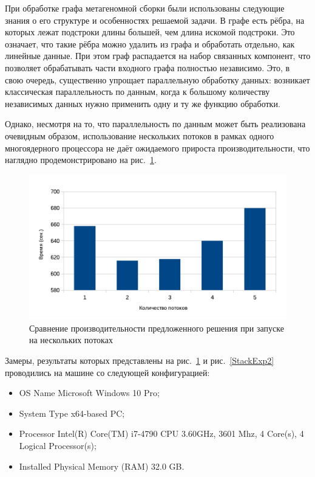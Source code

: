 При обработке графа метагеномной сборки были использованы следующие знания о его структуре и особенностях решаемой задачи. В графе есть рёбра, на которых лежат подстроки длины большей, чем длина искомой подстроки. Это означает, что такие рёбра можно удалить из графа и обработать отдельно, как линейные данные. При этом граф распадается на набор связанных компонент, что позволяет обрабатывать части входного графа полностью независимо. Это, в свою очередь, существенно упрощает параллельную обработку данных: возникает классическая параллельность по данным, когда к большому количеству независимых данных нужно применить одну и ту же функцию обработки. 

Однако, несмотря на то, что параллельность по данным может быть реализована очевидным образом, использование нескольких потоков в рамках одного многоядерного процессора не даёт ожидаемого прироста производительности, что наглядно продемонстрировано на рис.~\ref{StackExp}.

\begin{figure}
 \centering
 \includegraphics[width=\textwidth]{Ragozina/pics/Queue.pdf}
 \caption{Сравнение производительности предложенного решения при запуске на нескольких потоках}
 \label{StackExp}
\end{figure} 

Замеры, результаты которых представлены на рис.~\ref{StackExp} и рис.~\ref{StackExp2} проводились на машине со следующей конфигурацией:

\begin{itemize}
\item OS Name Microsoft Windows 10 Pro;
\item System Type x64-based PC;
\item Processor	Intel(R) Core(TM) i7-4790 CPU 3.60GHz, 3601 Mhz, 4 Core(s), 4 Logical Processor(s);
\item Installed Physical Memory (RAM) 32.0 GB.
\end{itemize}

